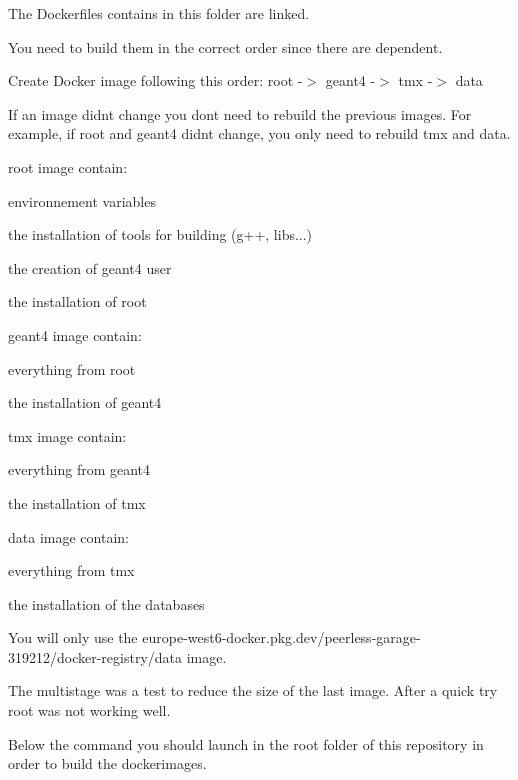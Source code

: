 The Dockerfiles contains in this folder are linked.

You need to build them in the correct order since there are dependent.

Create Docker image following this order\+: root -\/\texorpdfstring{$>$}{>} geant4 -\/\texorpdfstring{$>$}{>} tmx -\/\texorpdfstring{$>$}{>} data

If an image didn\textquotesingle{}t change you don\textquotesingle{}t need to rebuild the previous images. For example, if root and geant4 didn\textquotesingle{}t change, you only need to rebuild tmx and data.

root image contain\+:
\begin{DoxyItemize}
\item environnement variables
\item the installation of tools for building (g++, libs...)
\item the creation of geant4 user
\item the installation of root
\end{DoxyItemize}

geant4 image contain\+:
\begin{DoxyItemize}
\item everything from root
\item the installation of geant4
\end{DoxyItemize}

tmx image contain\+:
\begin{DoxyItemize}
\item everything from geant4
\item the installation of tmx
\end{DoxyItemize}

data image contain\+:
\begin{DoxyItemize}
\item everything from tmx
\item the installation of the databases
\end{DoxyItemize}

You will only use the europe-\/west6-\/docker.\+pkg.\+dev/peerless-\/garage-\/319212/docker-\/registry/data image.

The multistage was a test to reduce the size of the last image. After a quick try root was not working well.

Below the command you should launch in the root folder of this repository in order to build the dockerimages.


